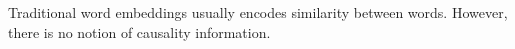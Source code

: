 

Traditional word embeddings usually encodes similarity between words. However, there is no notion of causality information.

